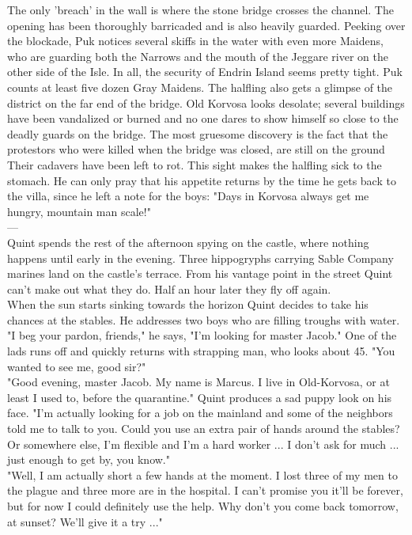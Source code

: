 The only 'breach' in the wall is where the stone bridge crosses the channel. The opening has been thoroughly barricaded and is also heavily guarded. Peeking over the blockade, Puk notices several skiffs in the water with even more Maidens, who are guarding both the Narrows and the mouth of the Jeggare river on the other side of the Isle. In all, the security of Endrin Island seems pretty tight. Puk counts at least five dozen Gray Maidens. The halfling also gets a glimpse of the district on the far end of the bridge. Old Korvosa looks desolate; several buildings have been vandalized or burned and no one dares to show himself so close to the deadly guards on the bridge. The most gruesome discovery is the fact that the protestors who were killed when the bridge was closed, are still on the ground Their cadavers have been left to rot. This sight makes the halfling sick to the stomach. He can only pray that his appetite returns by the time he gets back to the villa, since he left a note for the boys: "Days in Korvosa always get me hungry, mountain man scale!"\\

---\\

Quint spends the rest of the afternoon spying on the castle, where nothing happens until early in the evening. Three hippogryphs carrying Sable Company marines land on the castle's terrace. From his vantage point in the street Quint can't make out what they do. Half an hour later they fly off again.\\

When the sun starts sinking towards the horizon Quint decides to take his chances at the stables. He addresses two boys who are filling troughs with water. "I beg your pardon, friends," he says, "I'm looking for master Jacob." One of the lads runs off and quickly returns with strapping man, who looks about 45. "You wanted to see me, good sir?"\\

"Good evening, master Jacob. My name is Marcus. I live in Old-Korvosa, or at least I used to, before the quarantine." Quint produces a sad puppy look on his face. "I'm actually looking for a job on the mainland and some of the neighbors told me to talk to you. Could you use an extra pair of hands around the stables? Or somewhere else, I'm flexible and I'm a hard worker ... I don't ask for much ... just enough to get by, you know."\\

"Well, I am actually short a few hands at the moment. I lost three of my men to the plague and three more are in the hospital. I can't promise you it'll be forever, but for now I could definitely use the help. Why don't you come back tomorrow, at sunset? We'll give it a try ..."\\

